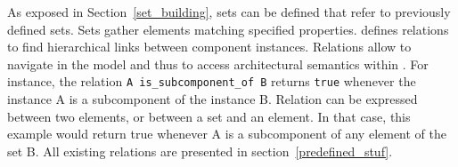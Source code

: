 As exposed in Section~\ref{set_building}, sets can be defined that
refer to previously defined sets. Sets gather elements matching
specified properties. \real{} defines relations to find hierarchical
links between \aadl{} component instances. Relations allow to navigate
in the \aadl{} model and thus to access \aadl{} architectural
semantics within \real{}. For instance, the relation \texttt{A
  is\_subcomponent\_of B} returns \texttt{true} whenever the
instance A is a subcomponent of the instance B.  Relation can be
expressed between two elements, or between a set and an element. In
that case, this example would return true whenever A is a subcomponent
of any element of the set B. All existing relations are presented in
section~\ref{predefined_stuf}.

